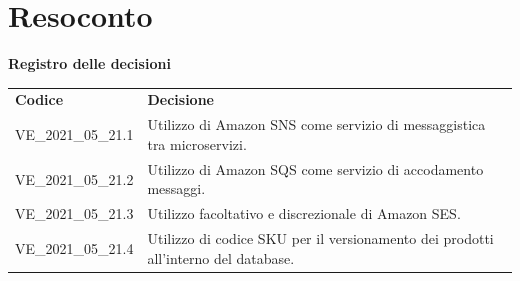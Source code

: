 \documentclass[a4paper]{article}
\begin{document}
\section{Resoconto}
\begin{center}
    \textbf{\Large Registro delle decisioni}\\
    \vspace{10px}
    \begin{table}[h!]
        \centering
        \renewcommand{\arraystretch}{1.8}
        \begin{tabular}{p{200px} p{200px}}
            \rowcolor{logo!70} \textbf{Codice} & \textbf{Decisione}                                                                 \\
            VE\_2021\_05\_21.1                 & Utilizzo di Amazon SNS come servizio di messaggistica tra microservizi.            \\
            VE\_2021\_05\_21.2                 & Utilizzo di Amazon SQS come servizio di accodamento messaggi.                      \\
            VE\_2021\_05\_21.3                 & Utilizzo facoltativo e discrezionale di Amazon SES.                                \\
            VE\_2021\_05\_21.4                 & Utilizzo di codice SKU per il versionamento dei prodotti all'interno del database.
        \end{tabular}
    \end{table}
\end{center}
\end{document}
